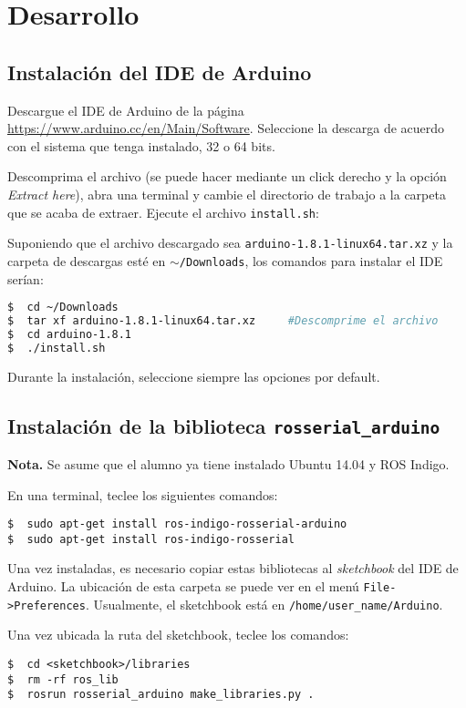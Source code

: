\documentclass[a4paper,12pt]{article}
\begin{document}
\section{Desarrollo}
\subsection{Instalación del IDE de Arduino}

Descargue el IDE de Arduino de la página \url{https://www.arduino.cc/en/Main/Software}. Seleccione la descarga de acuerdo con el sistema que tenga instalado, 32 o 64 bits. 

Descomprima el archivo (se puede hacer mediante un click derecho y la opción \textit{Extract here}), abra una terminal y cambie el directorio de trabajo a la carpeta que se acaba de extraer. Ejecute el archivo \texttt{install.sh}:

Suponiendo que el archivo descargado sea \texttt{arduino-1.8.1-linux64.tar.xz} y la carpeta de descargas esté en \texttt{$\sim$/Downloads}, los comandos para instalar el IDE serían:
\begin{lstlisting}[language=bash]
$  cd ~/Downloads      
$  tar xf arduino-1.8.1-linux64.tar.xz     #Descomprime el archivo
$  cd arduino-1.8.1
$  ./install.sh
\end{lstlisting}

Durante la instalación, seleccione siempre las opciones por default. 

\subsection{Instalación de la biblioteca \texttt{rosserial\_arduino}}
\textbf{Nota.} Se asume que el alumno ya tiene instalado Ubuntu 14.04 y ROS Indigo. 

En una terminal, teclee los siguientes comandos:
\begin{lstlisting}
$  sudo apt-get install ros-indigo-rosserial-arduino
$  sudo apt-get install ros-indigo-rosserial
\end{lstlisting}

Una vez instaladas, es necesario copiar estas bibliotecas al \textit{sketchbook} del IDE de Arduino. La ubicación de esta carpeta se puede ver en el menú \texttt{File->Preferences}. Usualmente, el sketchbook está en \texttt{/home/user\_name/Arduino}. 

Una vez ubicada la ruta del sketchbook, teclee los comandos:
\begin{lstlisting}
$  cd <sketchbook>/libraries
$  rm -rf ros_lib
$  rosrun rosserial_arduino make_libraries.py .
\end{lstlisting}
\end{document}
